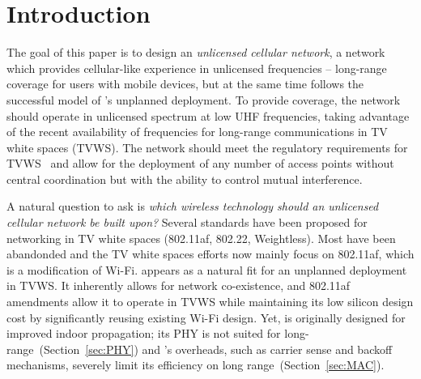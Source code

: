 \section{Introduction}

The goal of this paper is to design an {\em unlicensed cellular network}, a network which provides cellular-like experience in unlicensed frequencies -- long-range coverage for users with mobile devices,
but at the same time follows the successful model of \wf's unplanned deployment.
To provide coverage, the network should operate in unlicensed spectrum at low UHF frequencies,
taking advantage of the recent availability of frequencies for long-range communications in TV white spaces (TVWS).
The network should meet the regulatory requirements for TVWS~\cite{etsi_tvws, Rice_af} and allow for the deployment of any number of access points without central coordination but with the ability to control mutual interference.

A natural question to ask is \emph{which wireless technology should an unlicensed cellular network be built upon?}
Several standards have been proposed for networking in TV white spaces (802.11af\cite{Rice_af}, 802.22\cite{802.22}, Weightless\cite{weightless}). Most have been abandonded and the TV white spaces efforts now mainly focus 
on 802.11af, which is a modification of Wi-Fi. 
\wf appears as a natural fit for an unplanned deployment in TVWS.
It inherently allows for network co-existence, and 802.11af amendments allow it to operate in TVWS while maintaining its low silicon design cost by significantly reusing existing Wi-Fi design. 
Yet, \wf is originally designed for improved indoor propagation; its PHY is not suited for long-range~(Section~\ref{sec:PHY}) and 
\wf's overheads, such as carrier sense and backoff mechanisms, severely limit its efficiency on long range~(Section~\ref{sec:MAC}). 



